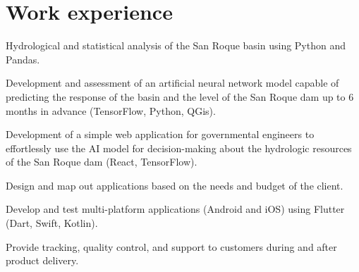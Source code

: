 \documentclass[]{deedy-resume-openfont}
\begin{document}
%
%
\lastupdated

%
%

%
%
\begin{minipage}[t]{0.48\textwidth} 


\section{Work experience} 

\begin{tightemize}
\vspace{\topsep} %
\item Hydrological and statistical analysis of the San Roque basin using Python and Pandas.
\item Development and assessment of an artificial neural network model capable of predicting the response of the basin and the level of the San Roque dam up to 6 months in advance (TensorFlow, Python, QGis).
\item Development of a simple web application for governmental engineers to effortlessly use the AI model for decision-making about the hydrologic resources of the San Roque dam (React, TensorFlow).
\end{tightemize}
\sectionsep

\begin{tightemize}
\item Design and map out applications based on the needs and budget of the client.
\item Develop and test multi-platform applications (Android and iOS) using Flutter (Dart, Swift, Kotlin).
\item Provide tracking, quality control, and support to customers during and after product delivery.
\end{tightemize}
\sectionsep


\end{minipage}
\end{document}
